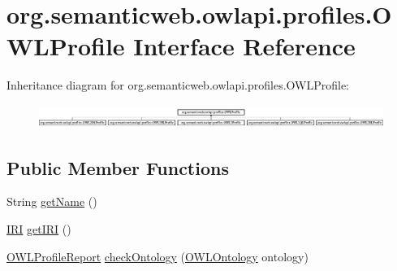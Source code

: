 \hypertarget{interfaceorg_1_1semanticweb_1_1owlapi_1_1profiles_1_1_o_w_l_profile}{\section{org.\-semanticweb.\-owlapi.\-profiles.\-O\-W\-L\-Profile Interface Reference}
\label{interfaceorg_1_1semanticweb_1_1owlapi_1_1profiles_1_1_o_w_l_profile}
}
Inheritance diagram for org.\-semanticweb.\-owlapi.\-profiles.\-O\-W\-L\-Profile\-:\begin{figure}[H]
\begin{center}
\leavevmode
\includegraphics[height=0.761905cm]{interfaceorg_1_1semanticweb_1_1owlapi_1_1profiles_1_1_o_w_l_profile}
\end{center}
\end{figure}
\subsection*{Public Member Functions}
\begin{DoxyCompactItemize}
\item 
String \hyperlink{interfaceorg_1_1semanticweb_1_1owlapi_1_1profiles_1_1_o_w_l_profile_a5dd9baeaba4c9170b2df1d037bc45ab9}{get\-Name} ()
\item 
\hyperlink{classorg_1_1semanticweb_1_1owlapi_1_1model_1_1_i_r_i}{I\-R\-I} \hyperlink{interfaceorg_1_1semanticweb_1_1owlapi_1_1profiles_1_1_o_w_l_profile_ab4952ec6a9ae4682638a9d2b3b05ea3b}{get\-I\-R\-I} ()
\item 
\hyperlink{classorg_1_1semanticweb_1_1owlapi_1_1profiles_1_1_o_w_l_profile_report}{O\-W\-L\-Profile\-Report} \hyperlink{interfaceorg_1_1semanticweb_1_1owlapi_1_1profiles_1_1_o_w_l_profile_a4ec9d5e7868d17ddd8c39a3b443684cf}{check\-Ontology} (\hyperlink{interfaceorg_1_1semanticweb_1_1owlapi_1_1model_1_1_o_w_l_ontology}{O\-W\-L\-Ontology} ontology)
\end{DoxyCompactItemize}
